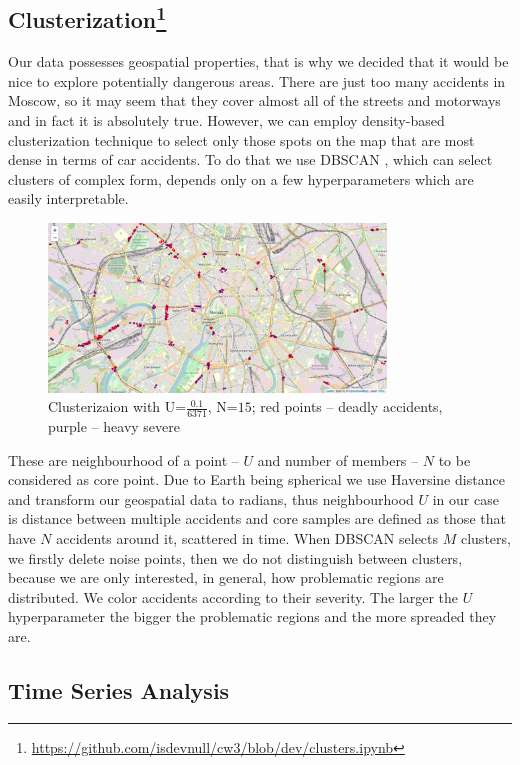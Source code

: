 \subsection[Clusterization]{Clusterization\footnote{\href{https://github.com/isdevnull/cw3/blob/dev/clusters.ipynb}
{https://github.com/isdevnull/cw3/blob/dev/clusters.ipynb}}}
Our data possesses geospatial properties, that is why we decided that it would be nice to explore potentially dangerous areas. There are just too
many accidents in Moscow, so it may seem that they cover almost all of the streets and motorways and in fact it is absolutely true. However,
we can employ density-based clusterization technique to select only those spots on the map that are most dense in terms of car accidents. To do that
we use DBSCAN \cite{DBSCAN}, which can select clusters of complex form, depends only on a few hyperparameters which are easily interpretable.
\begin{figure}[H]
	\centering
	\includegraphics[width=0.8\textwidth]{../imgs/png_files/msc_problem_regions.png}
	\caption{Clusterizaion with U=$\frac{0.1}{6371}$, N=$15$; red points – deadly accidents, purple – heavy severe}
	\label{fig:DBSCAN}
\end{figure}
These are neighbourhood of a point – $U$ and number of members – $N$ to be considered as core point.
Due to Earth being spherical we use Haversine distance and
transform our geospatial data to radians, thus neighbourhood $U$ in our case is distance between multiple accidents and core samples are defined as
those that have $N$ accidents around it, scattered in time. When DBSCAN selects $M$ clusters, we firstly delete noise points, then we do not
distinguish between clusters, because we are only interested, in general, how problematic regions are distributed. We color accidents according
to their severity. The larger the $U$ hyperparameter the bigger the problematic regions and the more spreaded they are.
\subsection{Time Series Analysis}

